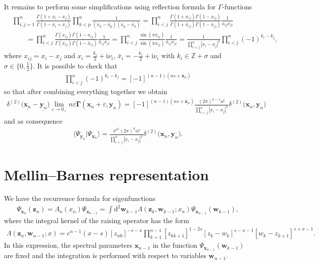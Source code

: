 \documentclass[10pt,a4paper]{amsart}
\renewcommand{\imath}{\mathrm{i}}
\numberwithin{equation}{section}
\begin{document}
It remains to perform some simplifications using
reflection formula for $\Gamma$-functions
\begin{align*}
&
\prod\limits_{i,j=1}^n
\frac{\Gamma(1+x_i-x_j)}{\Gamma(1 -\bar{x}_i+\bar{x}_j)}
\prod\limits_{k<p}^n \frac{1}
{(x_{k}-x_{p}) (x_{p}-x_{k})} =
\prod\limits_{i<j}^n
\frac{\Gamma(1+x_{ij})\Gamma(1-x_{ij})}
{\Gamma(1+\bar{x}_{ij})\Gamma(1 -\bar{x}_{ij})} \frac{1}
{x_{ij} x_{ji}} \\
& \qquad=
\prod\limits_{i<j}^n
\frac{\Gamma(x_{ij})\Gamma(1-x_{ij})}
{\Gamma(\bar{x}_{ij})\Gamma(1 -\bar{x}_{ij})} \frac{1}
{\bar{x}_{ij} x_{ji}} = \prod\limits_{i<j}^n
\frac{\sin(\pi \bar{x}_{ij})}
{\sin(\pi x_{ij})} \frac{1}
{\bar{x}_{ij} x_{ji}} = \frac{1}
{\prod\limits_{i<j}^n |x_i-x_j|^2}
\prod\limits_{i<j}^n (-1)^{k_i-k_j} ,
\end{align*}
where $x_{ij} = x_i-x_j$ and
$x_i = \tfrac{k_i}{2}+\imath\nu_i$, $\bar{x}_i = -\tfrac{k_i}{2}+\imath\nu_i$
with $k_i \in \mathbb{Z}+\sigma$ and $\sigma \in \bigl\{0, \tfrac{1}{2}\bigr\}$.
It is possible to check that
\begin{align*}
\prod\limits_{i<j}^n (-1)^{k_i-k_j} = [-1]^{(n-1)(ns+\underline{\bm{x}_n})}
\end{align*}
so that after combining everything together we obtain
\begin{align*}
\delta^{(2)}\bigl(\underline{\bm{x}_n}-\underline{\bm{y}_n}\bigr)
\lim_{\varepsilon\to 0_+}
n \varepsilon \mathbf{\Gamma}(\bm{x}_n+\varepsilon, \bm{y}_n) =
[-1]^{(n-1)(ns+\underline{\bm{x}_n})}
\frac{(2\pi)^{n-1} n! }{\prod\limits_{i<j}^n |x_i-x_j|^2}
\delta^{(2)}\bigl(\bm{x}_n,\bm{y}_n \bigr)
\end{align*}
and as consequence
\begin{align*}
\langle\Psi_{\bm{y}_n}|\Psi_{\bm{x}_n}\rangle =
\frac{\pi^{n^2} (2\pi)^{n} n!}{\prod\limits_{i<j}^n |x_i-x_j|^2}
\delta^{(2)}\bigl(\bm{x}_n,\bm{y}_n \bigr) .
\end{align*}


\section{Mellin--Barnes representation}
\label{sect:MB}

We have the recurrence formula for eigenfunctions
\begin{align*}
\Psi_{\bm{x}_n}(\bm{z}_n) =
\Lambda_n( x_n) \Psi_{\bm{x}_{n-1}} = \int \mathrm{d}^{2} \bm w_{k-1}
\Lambda(\bm z_k,\bm w_{k-1};x_n)
\Psi_{\bm{x}_{n-1}}(\bm w_{k-1}) ,
\end{align*}
where the integral kernel of the raising operator has the form
\begin{align*}
\Lambda(\bm z_n,\bm w_{n-1};x) =
c^{n-1}(x-s) [z_{n0}]^{-s-x}
\prod\limits_{k=1}^{n-1}
[z_{k k+1}]^{1-2s}[z_k-w_k]^{s-x-1}[w_k -z_{k+1}]^{s+x-1} .
\end{align*}
In this expression, the spectral parameters $\bm{x}_{n-1}$ in the function
$\Psi_{\bm{x}_{n-1}}(\bm w_{k-1})$ are fixed and the integration is performed with respect to variables $\bm{w}_{n-1}$.
\end{document}
